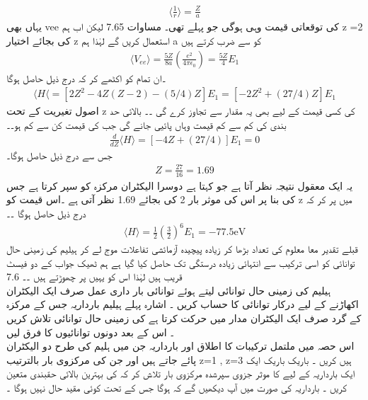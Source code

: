 \begin{align}
\langle \frac{1}{r} \rangle = \frac{Z}{a} 
\end{align}
 یہاں بھی vee کی توقعاتی قیمت وہی ہوگی جو پہلے تھی۔
مساوات  7.65 لیکن اب ہم z =2 کی بجائے اختیار z استعمال کریں گے لہٰذا ہم a کو    سے ضرب کرتے ہیں 
 \begin{align}
\langle V_{ee} \rangle =\frac{5Z}{8a}(\frac{e^{2}}{4\pi\epsilon_{0}})=\frac{5Z}{4}E_{1} 
\end{align}
  ۔ان تمام کو اکٹھے کر کہ درج ذیل حاصل ہوگا 
 \begin{align}
\langle H \langle =[2Z^{2}-4Z(Z-2)-(5/4)Z]E_{1}=[-2Z^{2}+(27/4)Z]E_{1} 
\end{align}
 اصول تغیریت کے تحت z کی کسی قیمت کے لیے بھی یہ مقدار   سے تجاوز کرے گی ۔۔
بالائی حد بندی کی کم سے کم قیمت وہاں پائیی جانے گی جب    کی قیمت کن سے کم ہو۔۔
\begin{align}
\frac{d}{dZ}\langle H \rangle =[-4Z+(27/4)]E_{1}=0
\end{align}
 جس سے درج ذیل حاصل ہوگا۔
\begin{align}
Z=\frac{27}{16}=1.69
\end{align}
 یہ ایک معقول نتیجہ نظر آتا ہے جو کہتا ہے دوسرا الیکٹران مرکزہ کو سپر کرتا ہے جس کی بنا پر اس کی موثر بار 2 کی بجائے 1.69 نظر آتی ہے ۔اس قیمت کو z میں پر کر کہ درج ذیل حاصل ہوگا ۔۔
\begin{align}
\langle H \rangle =\frac{1}{2}(\frac{3}{2})^{6}E_{1}=-77.5\text{eV} 
\end{align}
 قبلے تقدیر معا معلوم کی تعداد بڑھا کر زیادہ پیچیدہ آزمائشی تفاعلات موج لے کر ہیلیم کی زمینی حال توانائی کو اسی ترکیب سے انتہائی زیادہ درستگی تک حاصل کیا گیا ہے ہم ٹھیک جواب کے دو فیسٹ قریب ہیں لہٰذا اس کو یہیں پر چھوڑتے ہیں ۔۔
7.6\\
ہیلیم کی زمینی حال توانائی    لیتے ہوئے توانائی بار داری عمل صرف ایک الیکٹران اکھاڑنے کے لیے درکار توانائی کا حساب کریں ۔
اشارہ پہلے ہیلیم بارداریہ   جس کے مرکزہ کے گرد صرف ایک الیکٹران مدار میں حرکت کرتا ہے کی زمینی حال توانائی تلاش کریں ۔
اس کے بعد دونوں توانائیوں کا فرق لیں 
\\
اس حصہ میں ملتمل ترکیبات کا اطلاق    اور    بارداریہ جن میں ہلیم کی طرح دو الیکٹران پائے جاتے ہیں اور جن کی مرکزوی بار بالترتیب z=1 , z=3 ہیں کریں ۔
باریک باریک ایک ایک بارداریہ کے لیے کا موثر جزوی سپرشدہ مرکزوی بار تلاش کر کہ    کی بہترین بالائی حقبندی متعین کریں ۔
 بارداریہ    کی صورت میں آپ دیکھیں گے کہ     ہوگا جس کے تحت کوئی مقید حال نہیں ہوگا ۔
